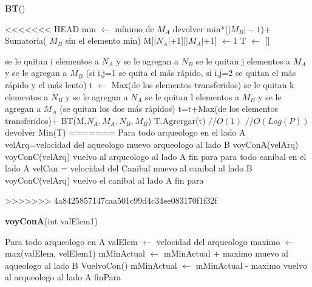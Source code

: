 \documentclass[spanish,12pt]{article}
\begin{document}
\begin{algorithm}[H]{\textbf{BT}() }
	\begin{algorithmic}
<<<<<<< HEAD
			\State min $\gets$  mínimo de $M_A$
			\State devolver min*($|M_B|-1$)+ Sumatoria( $M_B$ sin el elemento min)
		\EndIf
		\State M[$|N_A$|+1][$|M_A|$+1] $\gets$1
		\State T $\gets$ []

					\State se le quitan i elementos a $N_A$ y se le agregan a $N_B$
					\State se le quitan j elementos a $M_A$ y se le agregan a $M_B$
					\State (si i,j=1 se quita el más rápido, si i,j=2 se quitan el más rápido y el más lento)
					\State t $\gets$ Max(de los elementos transferidos)
								\State se le quitan k elementos a $N_B$ y se le agregan a $N_A$
								\State se le quitan l elementos a $M_B$ y se le agregan a $M_A$
								\State (se quitan los dos más rápidos)
								\State t=t+Max(de los elementos transferidos)+ BT(M,$N_A,M_A,N_B,M_B$)
								\State T.Agrergar(t)
							\EndIf
						\EndWhile
					\EndWhile
				\EndIf
			\EndWhile $//O(1)$
		\EndWhile$//O(Log(P))$
		\State devolver Min(T)
=======
		\State Para todo arqueologo en el lado A
		\State \quad  velArq=velocidad del aqueologo
		\State \quad muevo arqueologo al lado B
		\State \quad voyConA(velArq)
		\State \quad voyConC(velArq)
		\State \quad vuelvo al arqueologo al lado A
		\State fin para
		\State para todo canibal en el lado A
		\State \quad velCan = velocidad del Canibal
		\State \quad muevo al canibal al lado B
		\State \quad voyConC(velArq)
		\State \quad  vuelvo el canibal al lado A
		\State fin para
	\end{algorithmic}
\end{algorithm}
>>>>>>> 4a8425857147caa501c99d4c34ee083170f1f32f

\begin{algorithm}[H]{\textbf{voyConA}(int valElem1)}
	\begin{algorithmic}
	\State Para todo arqueologo en A
	\State \qquad valElem $\gets$ velocidad del arqueologo
	\State \qquad maximo $\gets$ max(valElem, velElem1)
	\State \qquad mMinActual $\gets$ mMinActual + maximo
	\State \qquad muevo al aqueologo al lado B
	\State \qquad VuelvoCon()
	\State \qquad mMinActual $\gets$ mMinActual - maximo
	\State \qquad vuelvo al arqueologo al lado A	
	\State finPara
	\end{algorithmic}
\end{algorithm}
\end{document}
